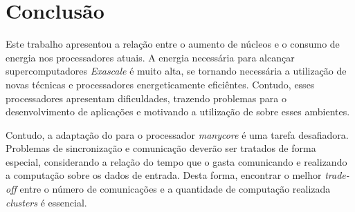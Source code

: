 \chapter{Conclusão}
\label{cha:conclusao}
Este trabalho apresentou a relação entre o aumento de núcleos e o consumo de
energia nos processadores atuais. A energia necessária para alcançar supercomputadores
\textit{Exascale} é muito alta, se tornando necessária a utilização de
novas técnicas e processadores energeticamente eficiêntes. Contudo, esses
processadores apresentam dificuldades, trazendo problemas para o desenvolvimento
de aplicações e motivando a utilização de \fws sobre esses ambientes.

Contudo, a adaptação do \fw para o processador \textit{manycore} \mppa é uma
tarefa desafiadora. Problemas de sincronização e comunicação deverão ser
tratados de forma especial, considerando a relação do tempo que o \fw gasta
comunicando e realizando a computação sobre os dados de entrada. Desta forma,
encontrar o melhor \textit{trade-off} entre o número de comunicações e a
quantidade de computação realizada \textit{clusters} é essencial.
